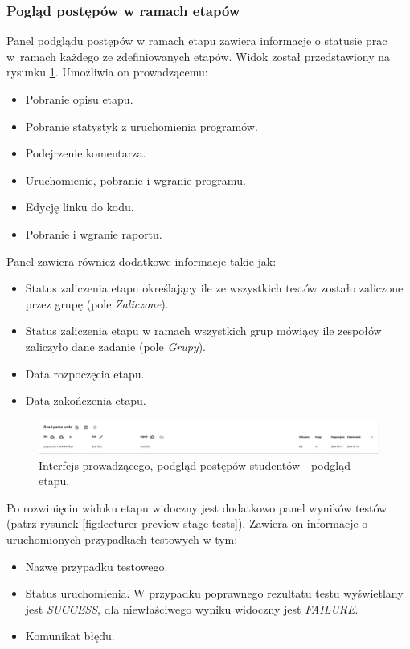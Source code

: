 \subsubsection{Pogląd postępów w ramach etapów}

Panel podglądu postępów w ramach etapu zawiera informacje o statusie prac w~ramach każdego ze zdefiniowanych etapów.
Widok został przedstawiony na rysunku \ref{fig:lecturer-preview-stage}.
Umożliwia on prowadzącemu:
\begin {itemize}
    \item Pobranie opisu etapu.
    \item Pobranie statystyk z uruchomienia programów.
    \item Podejrzenie komentarza.
    \item Uruchomienie, pobranie i wgranie programu.
    \item Edycję linku do kodu.
    \item Pobranie i wgranie raportu.
\end {itemize}

Panel zawiera również dodatkowe informacje takie jak:
\begin{itemize}
    \item Status zaliczenia etapu określający ile ze wszystkich testów zostało zaliczone przez grupę (pole \textit{Zaliczone}).
    \item Status zaliczenia etapu w ramach wszystkich grup mówiący ile zespołów zaliczyło dane zadanie (pole \textit{Grupy}).
    \item Data rozpoczęcia etapu.
    \item Data zakończenia etapu.
\end{itemize}

\begin{figure}[h]
    \centering
    \includegraphics[width = 13cm]{chapter04/lecturer_preview_stage.png}
    \caption{Interfejs prowadzącego, podgląd postępów studentów - podgląd etapu.}
    \label{fig:lecturer-preview-stage}
\end{figure}

Po rozwinięciu widoku etapu widoczny jest dodatkowo panel wyników testów (patrz rysunek \ref{fig:lecturer-preview-stage-tests}).
Zawiera on informacje o uruchomionych przypadkach testowych w tym:
\begin{itemize}
    \item Nazwę przypadku testowego.
    \item Status uruchomienia. W przypadku poprawnego rezultatu testu wyświetlany jest \textit{SUCCESS}, dla niewłaściwego wyniku widoczny jest \textit{FAILURE}.
    \item Komunikat błędu.
\end{itemize}

